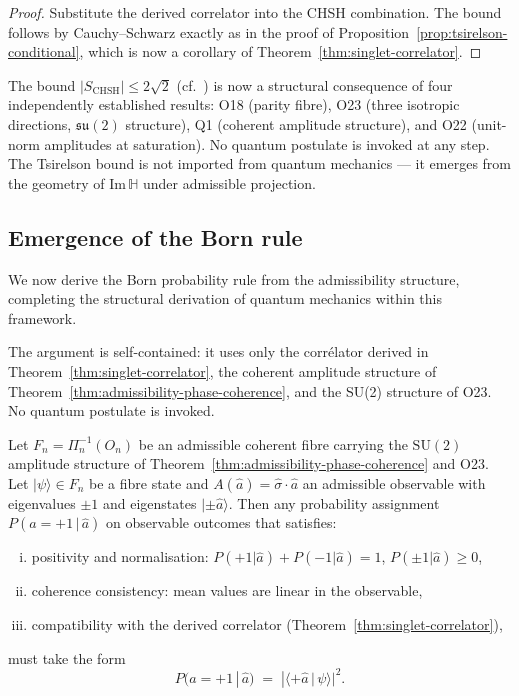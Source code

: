 \begin{proof}
  Substitute the derived correlator into the CHSH combination.
  The bound follows by Cauchy--Schwarz exactly as in the proof of
  Proposition~\ref{prop:tsirelson-conditional}, which is now a corollary
  of Theorem~\ref{thm:singlet-correlator}.
\end{proof}

\begin{remark}
  The bound $|S_{\mathrm{CHSH}}| \leq 2\sqrt{2}$ (cf.~\cite{Tsirelson1980})
  is now a structural consequence of four independently established results: O18 (parity fibre),
  O23 (three isotropic directions, $\mathfrak{su}(2)$ structure),
  Q1 (coherent amplitude structure), and O22 (unit-norm amplitudes at
  saturation).
  No quantum postulate is invoked at any step.
  The Tsirelson bound is not imported from quantum mechanics —
  it emerges from the geometry of $\mathrm{Im}\,\mathbb{H}$ under
  admissible projection.
\end{remark}

\subsection{Emergence of the Born rule}
\label{subsec:born-rule}

We now derive the Born probability rule from the admissibility structure,
completing the structural derivation of quantum mechanics within this framework.

The argument is self-contained: it uses only the corrélator derived in
Theorem~\ref{thm:singlet-correlator}, the coherent amplitude structure of
Theorem~\ref{thm:admissibility-phase-coherence}, and the SU(2) structure of O23.
No quantum postulate is invoked.

\begin{theorem}
  \label{thm:born-rule}
  Let $F_n = \Pi_n^{-1}(O_n)$ be an admissible coherent fibre carrying the
  $\mathrm{SU}(2)$ amplitude structure of Theorem~\ref{thm:admissibility-phase-coherence}
  and O23.
  Let $|\psi\rangle \in F_n$ be a fibre state and $A(\hat{a}) = \hat{\sigma}\cdot\hat{a}$
  an admissible observable with eigenvalues $\pm 1$ and eigenstates
  $|\pm\hat{a}\rangle$.
  Then any probability assignment $P(a = +1\,|\,\hat{a})$ on observable outcomes
  that satisfies:
  \begin{enumerate}[(i)]
    \item positivity and normalisation: $P(+1|\hat{a}) + P(-1|\hat{a}) = 1$,
    $P(\pm 1|\hat{a}) \geq 0$,
    \item coherence consistency: mean values are linear in the observable,
    \item compatibility with the derived correlator
    (Theorem~\ref{thm:singlet-correlator}),
  \end{enumerate}
  must take the form
  \begin{equation}
    \label{eq:born}
    P(a = +1\,|\,\hat{a}) \;=\; |\langle +\hat{a}\,|\,\psi\rangle|^2.
  \end{equation}
\end{theorem}

